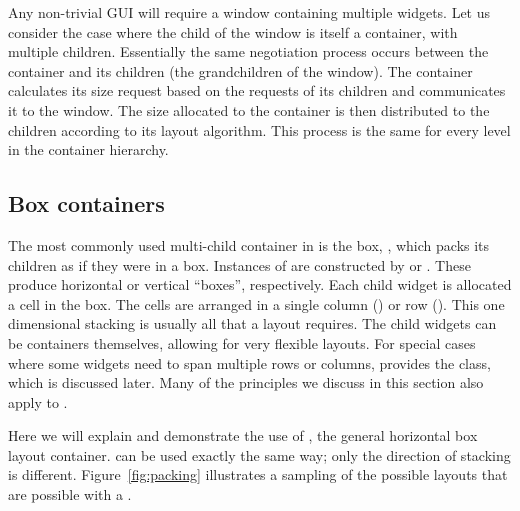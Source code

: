 Any non-trivial GUI will require a window containing multiple
widgets. Let us consider the case where the child of the window is
itself a container, with multiple children.  Essentially the same
negotiation process occurs between the container and its children (the
grandchildren of the window). The container calculates its size
request based on the requests of its children and communicates it to
the window. The size allocated to the container is then distributed to
the children according to its layout algorithm. This process is the
same for every level in the container hierarchy.

\subsection{Box containers}
\label{sec:RGtk2:layout:box}

The most commonly used multi-child container in \GTK\/ is the box,
, which packs its children as if they were in a
box. Instances of  are constructed by 
or .  These produce horizontal or vertical
``boxes'', respectively. Each child widget is allocated a cell in the
box.  The cells are arranged in a single column () or
row (). This one dimensional stacking is usually all
that a layout requires. The child widgets can be containers
themselves, allowing for very flexible layouts. For special cases
where some widgets need to span multiple rows or columns, \GTK\/
provides the  class, which is discussed later.  Many
of the principles we discuss in this section also apply to
.

Here we will explain and demonstrate the use of , the
general horizontal box layout container.  can be used
exactly the same way; only the direction of stacking is different.
Figure~\ref{fig:packing} illustrates a sampling of the possible
layouts that are possible with a .

